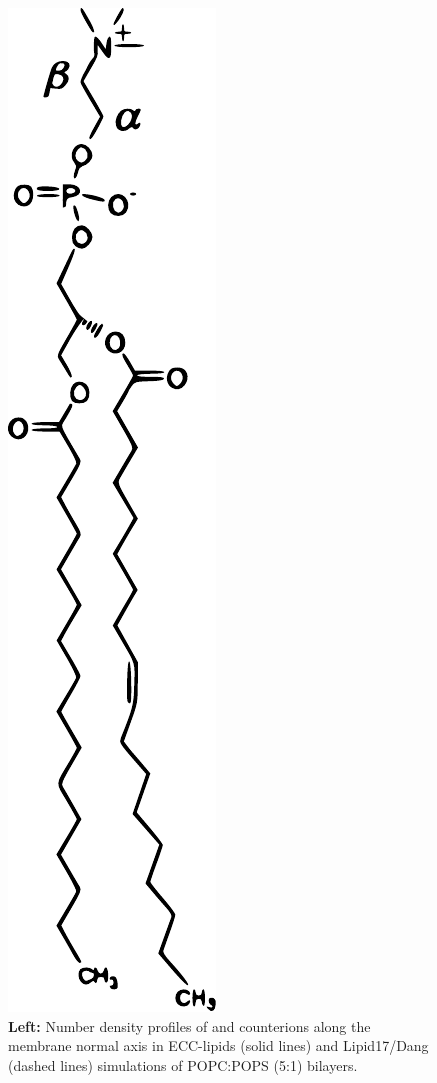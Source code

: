 \documentclass[journal=jpcbfk,manuscript=article]{achemso}
\newlength{\figheightsmall}
\newlength{\figheight}
\begin{document}
\begin{figure}[!tbp]
  \includegraphics[height=\figheightsmall]{../img/POPCstructure.pdf} 
  \caption{\label{fig:delta_ordPar_NaCl_PC-PS_mix_PC} 
    \textbf{Left:} Number density profiles of  and  counterions along the membrane normal axis
    in ECC-lipids (solid lines) and Lipid17/Dang (dashed lines) simulations of POPC:POPS (5:1) bilayers.  
}
\end{figure}
\end{document}
